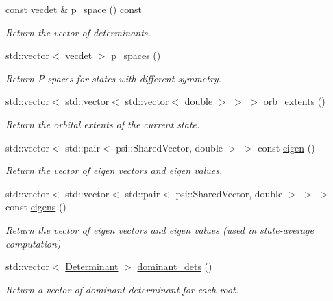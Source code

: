 \begin{DoxyCompactItemize}
const \mbox{\hyperlink{fci__mo_8h_a777ccac2de1a8940d2f654e59ff12f06}{vecdet}} \& \mbox{\hyperlink{classforte_1_1_f_c_i___m_o_a1c6e8fd8e4bcb8999665fa9ac17da1a0}{p\+\_\+space}} () const
\begin{DoxyCompactList}\small\item\em Return the vector of determinants. \end{DoxyCompactList}\item 
std\+::vector$<$ \mbox{\hyperlink{fci__mo_8h_a777ccac2de1a8940d2f654e59ff12f06}{vecdet}} $>$ \mbox{\hyperlink{classforte_1_1_f_c_i___m_o_a29679a2b8ea4938d3d84c2ea79e5c8d4}{p\+\_\+spaces}} ()
\begin{DoxyCompactList}\small\item\em Return P spaces for states with different symmetry. \end{DoxyCompactList}\item 
std\+::vector$<$ std\+::vector$<$ std\+::vector$<$ double $>$ $>$ $>$ \mbox{\hyperlink{classforte_1_1_f_c_i___m_o_a91129e602986de474006b82c0764df5b}{orb\+\_\+extents}} ()
\begin{DoxyCompactList}\small\item\em Return the orbital extents of the current state. \end{DoxyCompactList}\item 
std\+::vector$<$ std\+::pair$<$ psi\+::\+Shared\+Vector, double $>$ $>$ const \mbox{\hyperlink{classforte_1_1_f_c_i___m_o_a7c37f298fb6cbe8870b75d5fa3faa7c9}{eigen}} ()
\begin{DoxyCompactList}\small\item\em Return the vector of eigen vectors and eigen values. \end{DoxyCompactList}\item 
std\+::vector$<$ std\+::vector$<$ std\+::pair$<$ psi\+::\+Shared\+Vector, double $>$ $>$ $>$ const \mbox{\hyperlink{classforte_1_1_f_c_i___m_o_a604127ddded2873abc01f2a8e42e319a}{eigens}} ()
\begin{DoxyCompactList}\small\item\em Return the vector of eigen vectors and eigen values (used in state-\/average computation) \end{DoxyCompactList}\item 
std\+::vector$<$ \mbox{\hyperlink{namespaceforte_a2076c63fd7b8732004d9e1442ce527c1}{Determinant}} $>$ \mbox{\hyperlink{classforte_1_1_f_c_i___m_o_a997478ffd6afbf77f26b1a02679fb851}{dominant\+\_\+dets}} ()
\begin{DoxyCompactList}\small\item\em Return a vector of dominant determinant for each root. \end{DoxyCompactList}\item 

\end{DoxyCompactItemize}
